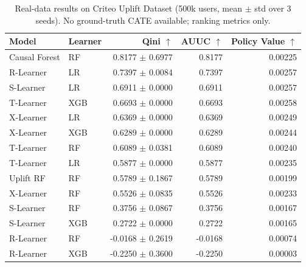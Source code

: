 \begin{table}[t]
\centering
\caption{Real-data results on Criteo Uplift Dataset (500k users, mean $\pm$ std over 3 seeds). No ground-truth CATE available; ranking metrics only.}
\label{tab:criteo_results}
\small
\begin{tabular}{llrrr}
\toprule
Model & Learner & Qini $\uparrow$ & AUUC $\uparrow$ & Policy Value $\uparrow$ \\
\midrule
Causal Forest & RF & 0.8177 $\pm$ 0.6977 & 0.8177 & 0.00225 \\
R-Learner & LR & 0.7397 $\pm$ 0.0084 & 0.7397 & 0.00257 \\
S-Learner & LR & 0.6911 $\pm$ 0.0000 & 0.6911 & 0.00257 \\
T-Learner & XGB & 0.6693 $\pm$ 0.0000 & 0.6693 & 0.00258 \\
X-Learner & LR & 0.6369 $\pm$ 0.0000 & 0.6369 & 0.00249 \\
X-Learner & XGB & 0.6289 $\pm$ 0.0000 & 0.6289 & 0.00244 \\
T-Learner & RF & 0.6089 $\pm$ 0.0381 & 0.6089 & 0.00240 \\
T-Learner & LR & 0.5877 $\pm$ 0.0000 & 0.5877 & 0.00235 \\
Uplift RF & RF & 0.5789 $\pm$ 0.1867 & 0.5789 & 0.00199 \\
X-Learner & RF & 0.5526 $\pm$ 0.0835 & 0.5526 & 0.00233 \\
S-Learner & RF & 0.3756 $\pm$ 0.0867 & 0.3756 & 0.00167 \\
S-Learner & XGB & 0.2722 $\pm$ 0.0000 & 0.2722 & 0.00165 \\
R-Learner & RF & -0.0168 $\pm$ 0.2619 & -0.0168 & 0.00074 \\
R-Learner & XGB & -0.2250 $\pm$ 0.3600 & -0.2250 & 0.00003 \\
\bottomrule
\end{tabular}
\end{table}